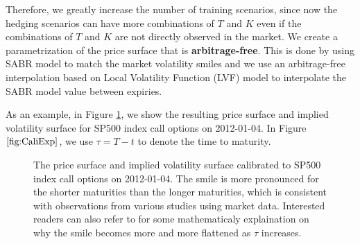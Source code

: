 \documentclass[letterpaper,12pt,titlepage,oneside,final]{book}
\numberwithin{equation}{section}
\theoremstyle{definition}
\begin{document}
Therefore, we greatly increase the number of training scenarios, since now the hedging scenarios can have more combinations of $T$ and $K$ even if the combinations of $T$ and $K$ are not directly observed in the market. 
We create a parametrization of the price surface that is \textbf{arbitrage-free}.  This is done by using SABR model to match the market volatility smiles and we use an arbitrage-free interpolation based on Local Volatility Function (LVF) model to interpolate the SABR model value between expiries.


As an example, in Figure \ref{fig:CaliExp}, we show the resulting price surface and implied  volatility surface for SP500 index call options  on 2012-01-04. In Figure $\ref{fig:CaliExp}$, we use $\tau=T-t$ to denote the time to maturity.  


\begin{figure}[htp!]
	\centering
	\caption{The price surface and implied volatility surface calibrated to SP500 index call options on 2012-01-04. The smile is more pronounced for the shorter maturities than the longer maturities, which is consistent with observations from various studies \cite{chance2017bias,rogers2010can} using market data. Interested readers can also refer to \cite{rogers2010can} for some mathematicaly explaination on why the smile becomes more and more flattened as $\tau$ increases.}
	\label{fig:CaliExp}
\end{figure}
\end{document}
